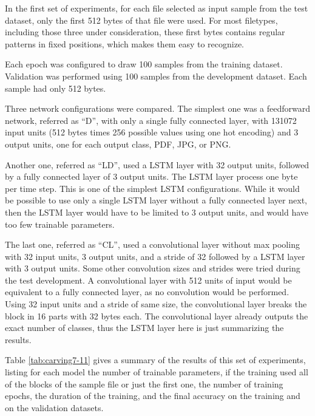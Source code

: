 
In the first set of experiments, for each file selected as input sample from the test dataset, only the first 512 bytes of that file were used. For most filetypes, including those three under consideration, these first bytes contains regular patterns in fixed positions, which makes them easy to recognize.

Each epoch was configured to draw 100 samples from the training dataset. Validation was performed using 100 samples from the development dataset. Each sample had only 512 bytes.

Three network configurations were compared. The simplest one was a feedforward network, referred as ``D'', with only a single fully connected layer, with 131072 input units (512 bytes times 256 possible values using one hot encoding) and 3 output units, one for each output class, PDF, JPG, or PNG.

Another one, referred as ``LD'', used a LSTM layer with 32 output units, followed by a fully connected layer of 3 output units. The LSTM layer process one byte per time step. This is one of the simplest LSTM configurations. While it would be possible to use only a single LSTM layer without a fully connected layer next, then the LSTM layer would have to be limited to 3 output units, and would have too few trainable parameters. 

The last one, referred as ``CL'', used a convolutional layer without max pooling with 32 input units, 3 output units, and a stride of 32 followed by a LSTM layer with 3 output units. Some other convolution sizes and strides were tried during the test development. A convolutional layer with 512 units of input would be equivalent to a fully connected layer, as no convolution would be performed. Using 32 input units and a stride of same size, the convolutional layer breaks the block in 16 parts with 32 bytes each. The convolutional layer already outputs the exact number of classes, thus the LSTM layer here is just summarizing the results.

Table \ref{tab:carving7-11} gives a summary of the results of this set of experiments, listing for each model the number of trainable parameters, if the training used all of the blocks of the sample file or just the first one, the number of training epochs, the duration of the training, and the final accuracy on the training and on the validation datasets.

